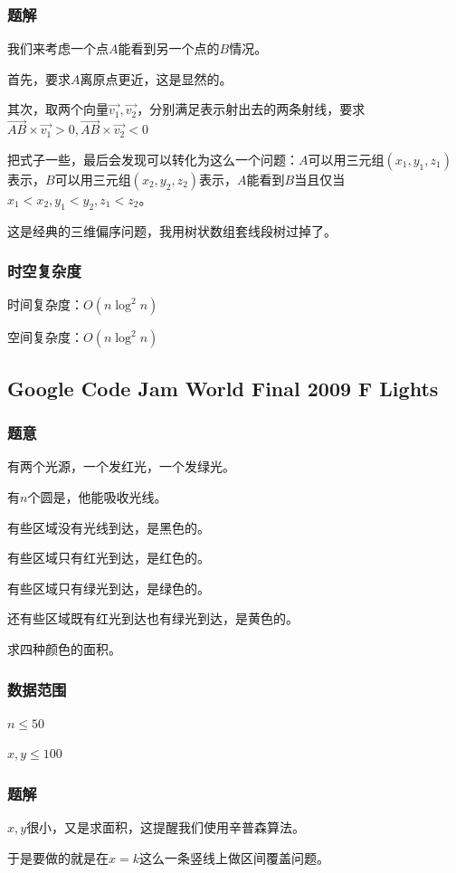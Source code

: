 \documentclass{ctexart}
\begin{document}
\subsubsection{题解}
我们来考虑一个点$A$能看到另一个点的$B$情况。

首先，要求$A$离原点更近，这是显然的。

其次，取两个向量$\overrightarrow{v_1},\overrightarrow{v_2}$，分别满足表示射出去的两条射线，要求$\overrightarrow{AB} \times \overrightarrow{v_1}>0,\overrightarrow{AB} \times \overrightarrow{v_2}<0$

把式子一些，最后会发现可以转化为这么一个问题：$A$可以用三元组$(x_1,y_1,z_1)$表示，$B$可以用三元组$(x_2,y_2,z_2)$表示，$A$能看到$B$当且仅当$x_1<x_2,y_1<y_2,z_1<z_2$。

这是经典的三维偏序问题，我用树状数组套线段树过掉了。
\subsubsection{时空复杂度}
时间复杂度：$O(n \log^2 n)$

空间复杂度：$O(n \log^2 n)$
\subsection{Google Code Jam World Final 2009 F Lights}
\subsubsection{题意}
有两个光源，一个发红光，一个发绿光。

有$n$个圆是，他能吸收光线。

有些区域没有光线到达，是黑色的。

有些区域只有红光到达，是红色的。

有些区域只有绿光到达，是绿色的。

还有些区域既有红光到达也有绿光到达，是黄色的。

求四种颜色的面积。
\subsubsection{数据范围}
$n \le 50$

$x,y \le 100$
\subsubsection{题解}
$x,y$很小，又是求面积，这提醒我们使用辛普森算法。

于是要做的就是在$x=k$这么一条竖线上做区间覆盖问题。
\end{document}
